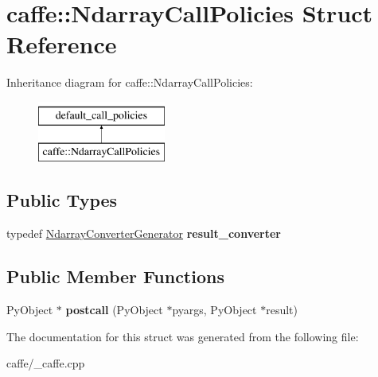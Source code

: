 \hypertarget{structcaffe_1_1_ndarray_call_policies}{}\section{caffe\+:\+:Ndarray\+Call\+Policies Struct Reference}
\label{structcaffe_1_1_ndarray_call_policies}
Inheritance diagram for caffe\+:\+:Ndarray\+Call\+Policies\+:\begin{figure}[H]
\begin{center}
\leavevmode
\includegraphics[height=2.000000cm]{structcaffe_1_1_ndarray_call_policies}
\end{center}
\end{figure}
\subsection*{Public Types}
\begin{DoxyCompactItemize}
\item 
\hypertarget{structcaffe_1_1_ndarray_call_policies_a810196d5439d3cede93f73998e1e2236}{}typedef \hyperlink{structcaffe_1_1_ndarray_converter_generator}{Ndarray\+Converter\+Generator} {\bfseries result\+\_\+converter}\label{structcaffe_1_1_ndarray_call_policies_a810196d5439d3cede93f73998e1e2236}

\end{DoxyCompactItemize}
\subsection*{Public Member Functions}
\begin{DoxyCompactItemize}
\item 
\hypertarget{structcaffe_1_1_ndarray_call_policies_ac1bb77e99e5a2f4bb556e582decf66da}{}Py\+Object $\ast$ {\bfseries postcall} (Py\+Object $\ast$pyargs, Py\+Object $\ast$result)\label{structcaffe_1_1_ndarray_call_policies_ac1bb77e99e5a2f4bb556e582decf66da}

\end{DoxyCompactItemize}


The documentation for this struct was generated from the following file\+:\begin{DoxyCompactItemize}
\item 
caffe/\+\_\+caffe.\+cpp\end{DoxyCompactItemize}
